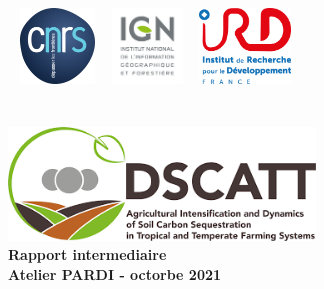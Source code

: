\begin{titlepage}
\begin{center}

\logoCirad ~ \includegraphics[height=20mm]{./logo/cnrs.png} ~ \includegraphics[height=20mm]{./logo/ign.png} ~ \includegraphics[height=20mm]{./logo/ird.png}\\[4cm]


\textsc{\Large }\\[0.5cm]

\HRule \\[0.4cm]
\includegraphics[height=30mm]{./logo/DSCATT.png}\\
{\huge \bfseries Rapport intermediaire \\
 Atelier PARDI - octorbe 2021 \\[0.4cm] }

\HRule \\[1.5cm]



\end{center}
\end{titlepage}
